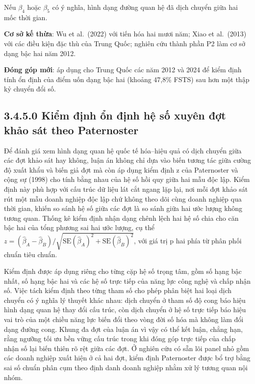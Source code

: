 \documentclass[
  a4paper,
  13pt]{extreport}
\begin{document}
Nếu \(\beta_4\) hoặc \(\beta_5\) có ý nghĩa, hình dạng đường quan hệ đã
dịch chuyển giữa hai mốc thời gian.

\textbf{Cơ sở kế thừa}: Wu et al.~(2022) với tiến hóa hai mươi năm; Xiao
et al.~(2013) với các điều kiện đặc thù của Trung Quốc; nghiên cứu thành
phần P2 làm cơ sở dạng bậc hai năm 2012.

\textbf{Đóng góp mới}: áp dụng cho Trung Quốc các năm 2012 và 2024 để
kiểm định tính ổn định của điểm uốn dạng bậc hai (khoảng 47,8\% FSTS)
sau hơn một thập kỷ chuyển đổi số.

\hypertarget{kiux1ec3m-ux111ux1ecbnh-ux1ed5n-ux111ux1ecbnh-hux1ec7-sux1ed1-xuyuxean-ux111ux1ee3t-khux1ea3o-suxe1t-theo-paternoster}{%
\subsection{3.4.5.0 Kiểm định ổn định hệ số xuyên đợt khảo sát theo
Paternoster}\label{kiux1ec3m-ux111ux1ecbnh-ux1ed5n-ux111ux1ecbnh-hux1ec7-sux1ed1-xuyuxean-ux111ux1ee3t-khux1ea3o-suxe1t-theo-paternoster}}

Để đánh giá xem hình dạng quan hệ quốc tế hóa--hiệu quả có dịch chuyển
giữa các đợt khảo sát hay không, luận án không chỉ dựa vào biến tương
tác giữa cường độ xuất khẩu và biến giả đợt mà còn áp dụng kiểm định z
của Paternoster và cộng sự (1998) cho tính bằng nhau của hệ số hồi quy
giữa hai mẫu độc lập. Kiểm định này phù hợp với cấu trúc dữ liệu lát cắt
ngang lặp lại, nơi mỗi đợt khảo sát rút một mẫu doanh nghiệp độc lập chứ
không theo dõi cùng doanh nghiệp qua thời gian, khiến so sánh hệ số giữa
các đợt là so sánh giữa hai ước lượng không tương quan. Thống kê kiểm
định nhận dạng chênh lệch hai hệ số chia cho căn bậc hai của tổng phương
sai hai ước lượng, cụ thể
\(z = (\hat\beta_A - \hat\beta_B) / \sqrt{\text{SE}(\hat\beta_A)^2 + \text{SE}(\hat\beta_B)^2}\),
với giá trị p hai phía từ phân phối chuẩn tiêu chuẩn.

Kiểm định được áp dụng riêng cho từng cặp hệ số trọng tâm, gồm số hạng
bậc nhất, số hạng bậc hai và các hệ số trực tiếp của năng lực công nghệ
và chấp nhận số. Việc tách kiểm định theo từng tham số cho phép phân
biệt hai loại dịch chuyển có ý nghĩa lý thuyết khác nhau: dịch chuyển ở
tham số độ cong báo hiệu hình dạng quan hệ thay đổi cấu trúc, còn dịch
chuyển ở hệ số trực tiếp báo hiệu vai trò của một chiều năng lực biến
đổi theo vòng đời số hóa mà không làm đổi dạng đường cong. Khung đa đợt
của luận án vì vậy có thể kết luận, chẳng hạn, rằng ngưỡng tối ưu bền
vững cấu trúc trong khi đóng góp trực tiếp của chấp nhận số lại biến
thiên rõ rệt giữa các đợt. Ở nghiên cứu có sẵn lõi panel nhỏ gồm các
doanh nghiệp xuất hiện ở cả hai đợt, kiểm định Paternoster được bổ trợ
bằng sai số chuẩn phân cụm theo định danh doanh nghiệp nhằm xử lý tương
quan nội nhóm.
\end{document}
